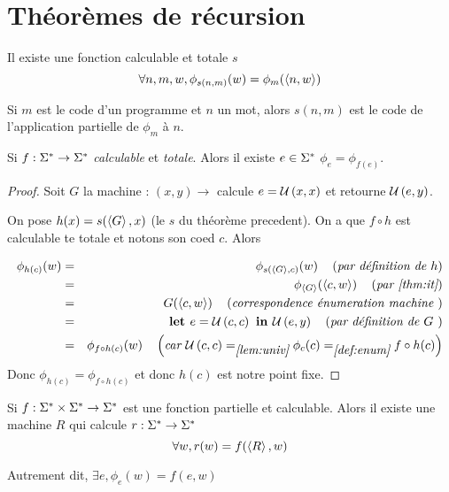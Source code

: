 \section{Théorèmes de récursion}


\begin{theorem}\label{thm:it}
	Il existe une fonction calculable et totale $s$ \tlq
	$$\forall n,m,w, \phi_{s(n,m)}(w) = \phi_m(\left\langle n,w\right\rangle)$$

	Si $m$ est le code d'un programme et $n$ un mot, alors $s(n,m)$ est le code de l'application partielle de $\phi_m$ à $n$.
\end{theorem}

\begin{theorem}
	Si $ f : \Sigma^{*} \to \Sigma^{*}$ \emph{calculable} et \emph {totale}. Alors il existe $e \in \Sigma^{*}$ \tq $\phi_e = \phi_{f(e)}$.
\end{theorem}


\begin{proof}
	Soit $G$ la machine : $(x,y) \to $ calcule $e = \mathcal U \left(x,x\right)$ et retourne $\mathcal U \left(e,y\right)$.

	On pose $h(x) = s(\left\langle G\right\rangle, x)$ (le $s$ du théorème precedent). On a que $f \circ h$ est calculable te totale et notons son coed $c$. Alors

	\begin{eqnarray*}
		\phi_{h(c)} (w) &=& \phi_{s(\left\langle G\right\rangle, c)} (w) \quad\left(\textit{par définition de $h$}\right) \\
		&=& \phi_{\left\langle G\right\rangle} (\left\langle c, w\right\rangle) \quad\left(\textit{par \ref{thm:it}}\right) \\
		&=& G (\left\langle c, w\right\rangle) \quad\left(\textit{correspondence énumeration machine }\right)\\
		&=& \textbf{let } e = \mathcal U \left(c,c\right) \textbf{ in } \mathcal U \left(e,y\right) \quad\left(\textit{par définition de $G$ }\right)\\
		&=& \phi_{f \circ h (c)}(w) \quad\left(\textit{car $\mathcal U \left(c,c\right) =_{\ref{lem:univ}} \phi_c(c) =_{\ref{def:enum}} f \circ h (c)$}\right)
	\end{eqnarray*}
	Donc $\phi_{h(c)} = \phi_{f \circ h (c)}$ et donc $h(c)$ est notre point fixe.
\end{proof}


\begin{theorem}[de récursion]
	Si $f : \Sigma^{*} \times \Sigma^{*} \to \Sigma^{*}$ est une fonction partielle et calculable. Alors il existe une machine $R$ qui calcule $r : \Sigma^{*} \to \Sigma^{*} $ \tq
	$$ \forall w, r(w) =  f (\left\langle R\right\rangle, w)$$

	Autrement dit, $\exists e, \phi_e (w) = f (e, w)$
\end{theorem}


